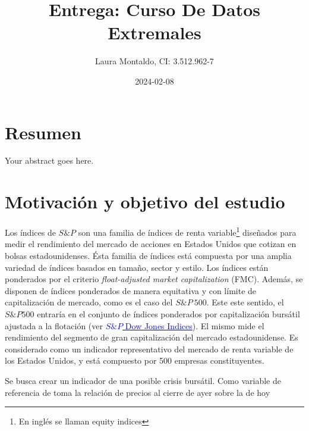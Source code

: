 \documentclass[
  12pt]{article}
\title{Entrega: Curso De Datos Extremales}
\author{Laura Montaldo, CI: 3.512.962-7}
\date{2024-02-08}
\begin{document}
\maketitle

\newpage

\thispagestyle{empty}

\maketitle

\newpage

\tableofcontents

\newpage

\hypertarget{resumen}{%
\section{Resumen}\label{resumen}}

Your abstract goes here.

\newpage

\hypertarget{motivaciuxf3n-y-objetivo-del-estudio}{%
\section{Motivación y objetivo del
estudio}\label{motivaciuxf3n-y-objetivo-del-estudio}}

Los índices de \(S\&P\) son una familia de índices de renta
variable\footnote{En inglés se llaman equity indices} diseñados para
medir el rendimiento del mercado de acciones en Estados Unidos que
cotizan en bolsas estadounidenses. Ésta familia de índices está
compuesta por una amplia variedad de índices basados en tamaño, sector y
estilo. Los índices están ponderados por el criterio
\textit{float-adjusted market capitalization} (FMC). Además, se disponen
de índices ponderados de manera equitativa y con límite de
capitalización de mercado, como es el caso del \(S\&P\:500\). Este este
sentido, el \(S\&P 500\) entraría en el conjunto de índices ponderados
por capitalización bursátil ajustada a la flotación (ver
\href{http://www.overleaf.com}{\textcolor{blue}{$S\&P$ Dow Jones Indices}}).
El mismo mide el rendimiento del segmento de gran capitalización del
mercado estadounidense. Es considerado como un indicador representativo
del mercado de renta variable de los Estados Unidos, y está compuesto
por 500 empresas constituyentes.

Se busca crear un indicador de una posible crisis bursátil. Como
variable de referencia de toma la relación de precios al cierre de ayer
sobre la de hoy
\end{document}
